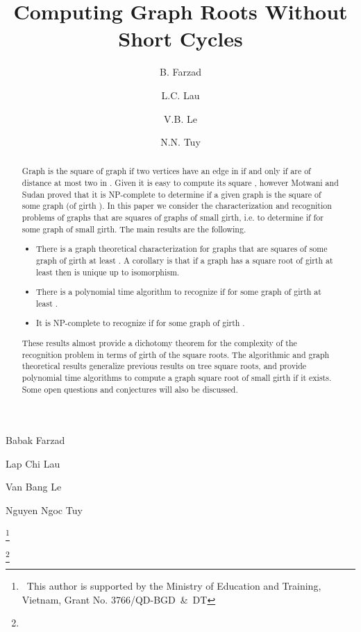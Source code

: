 \documentclass[proceedings]{stacs}
\newlength{\ai}
\begin{document}
\title[Computing Graph Roots Without Short Cycles]{Computing Graph Roots Without Short Cycles}

\author[ref1]{B. Farzad}{Babak Farzad}
\address[ref1]{Department of Mathematics, Brock University, Canada.}

\author[ref2]{L.C. Lau}{Lap Chi Lau}
\address[ref2]{Department of Computer Science and Engineering, The Chinese University of Hong Kong.}

\author[ref3]{V.B. Le}{Van Bang Le}
\address[ref3]{Universit\"at Rostock, Institut f\"ur Informatik, Germany.}

\author[ref3,ref4]{N.N. Tuy}{Nguyen Ngoc Tuy}
\address[ref4]{Hong Duc University, Vietnam.}
\thanks{\dag ~This author is supported by the Ministry of Education and Training, Vietnam, Grant No. 3766/QD-BGD~\&~DT}

\thanks{\color{white}{.}}

\begin{abstract}
\noindent
Graph  is the square of graph  if two vertices  have an edge in
   if and only if  are of distance at most two in .
Given  it is easy to compute its square ,
  however Motwani and Sudan proved that it is NP-complete
  to determine if a given graph  is the square of some graph  (of girth ).
In this paper we consider the characterization and recognition
  problems of graphs that are squares of graphs of small girth,
  i.e. to determine if  for some graph  of small girth.
The main results are the following.
\begin{itemize}
\item There is a graph theoretical characterization for graphs that are squares of
  some graph of girth at least .
A corollary is that if a graph  has a square root  of girth at least  then  is unique up to isomorphism.
\item There is a polynomial time algorithm to recognize if  for some graph  of girth at least .
\item It is NP-complete to recognize if  for some graph  of girth .
\end{itemize}
These results almost provide a dichotomy theorem for the complexity
  of the recognition problem in terms of girth of the square roots.
The algorithmic and graph theoretical results generalize previous
  results on tree square roots, and provide polynomial time algorithms
  to compute a graph square root of small girth if it exists.
Some open questions and conjectures will also be discussed.
\end{abstract}
\end{document}
